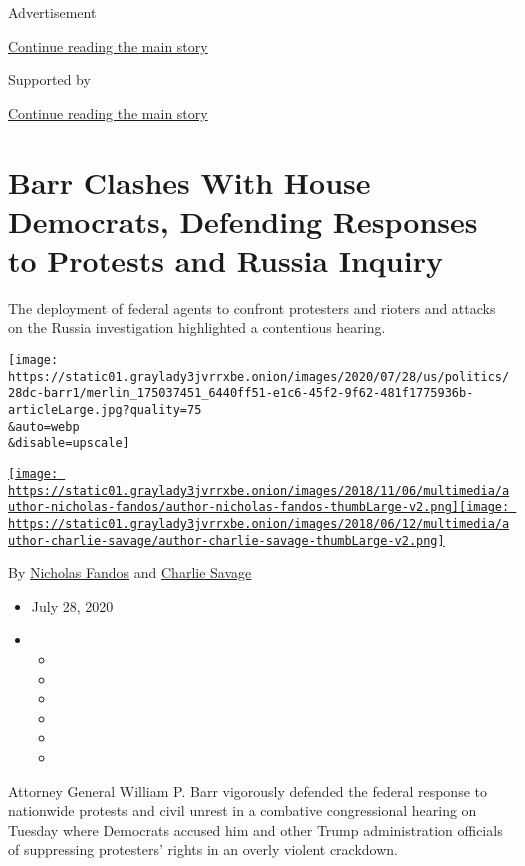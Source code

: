 Advertisement

\protect\hyperlink{after-top}{Continue reading the main story}

Supported by

\protect\hyperlink{after-sponsor}{Continue reading the main story}

\hypertarget{barr-clashes-with-house-democrats-defending-responses-to-protests-and-russia-inquiry}{%
\section{Barr Clashes With House Democrats, Defending Responses to
Protests and Russia
Inquiry}\label{barr-clashes-with-house-democrats-defending-responses-to-protests-and-russia-inquiry}}

The deployment of federal agents to confront protesters and rioters and
attacks on the Russia investigation highlighted a contentious hearing.

\texttt{[image: https://static01.graylady3jvrrxbe.onion/images/2020/07/28/us/politics/28dc-barr1/merlin\_175037451\_6440ff51-e1c6-45f2-9f62-481f1775936b-articleLarge.jpg?quality=75\\\&auto=webp\\\&disable=upscale]}

\href{https://www.nytimes3xbfgragh.onion/by/nicholas-fandos}{\texttt{[image: https://static01.graylady3jvrrxbe.onion/images/2018/11/06/multimedia/author-nicholas-fandos/author-nicholas-fandos-thumbLarge-v2.png]}}\href{https://www.nytimes3xbfgragh.onion/by/charlie-savage}{\texttt{[image: https://static01.graylady3jvrrxbe.onion/images/2018/06/12/multimedia/author-charlie-savage/author-charlie-savage-thumbLarge-v2.png]}}

By \href{https://www.nytimes3xbfgragh.onion/by/nicholas-fandos}{Nicholas
Fandos} and
\href{https://www.nytimes3xbfgragh.onion/by/charlie-savage}{Charlie
Savage}

\begin{itemize}
\item
  July 28, 2020
\item
  \begin{itemize}
  \item
  \item
  \item
  \item
  \item
  \item
  \end{itemize}
\end{itemize}

Attorney General William P. Barr vigorously defended the federal
response to nationwide protests and civil unrest in a combative
congressional hearing on Tuesday where Democrats accused him and other
Trump administration officials of suppressing protesters' rights in an
overly violent crackdown.

